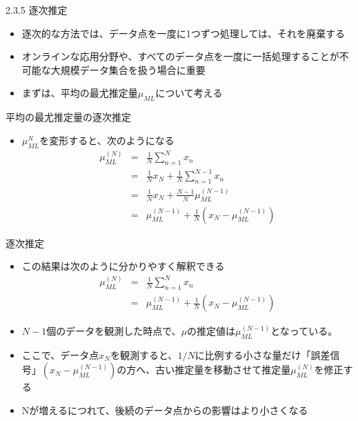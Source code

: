 \begin{frame}{2.3.5 逐次推定}
 \begin{itemize}
  \item 逐次的な方法では、データ点を一度に1つずつ処理しては、それを廃棄する
  \item オンラインな応用分野や、すべてのデータ点を一度に一括処理することが不可能な大規模データ集合を扱う場合に重要
  \item まずは、平均の最尤推定量$\mu_{ML}$について考える
 \end{itemize}
\end{frame}

\begin{frame}{平均の最尤推定量の逐次推定}
 \begin{itemize}
  \item $\mu_{ML}^{N}$を変形すると、次のようになる
        \begin{eqnarray}
         \mu_{ML}^{(N)} &= &\frac{1}{N}\sum_{n=1}^{N}x_n \nonumber \\
         & =& \frac{1}{N}x_N+\frac{1}{N}\sum_{n=1}^{N-1}x_n \nonumber \\
         & =& \frac{1}{N}x_N + \frac{N-1}{N}\mu_{ML}^{(N-1)}\nonumber \\
         & =& \mu_{ML}^{(N-1)} +\frac{1}{N} (x_N-\mu_{ML}^{(N-1)})\label{162008_21Nov14}
        \end{eqnarray}
 \end{itemize}
\end{frame}

\begin{frame}{逐次推定}
 \begin{itemize}
  \item この結果は次のように分かりやすく解釈できる
        \begin{eqnarray}
         \mu_{ML}^{(N)} &= &\frac{1}{N}\sum_{n=1}^{N}x_n \\
         & =& \mu_{ML}^{(N-1)} +\frac{1}{N} (x_N-\mu_{ML}^{(N-1)})
        \end{eqnarray}
  \item $N-1$個のデータを観測した時点で、$\mu$の推定値は$\mu_{ML}^{(N-1)}$となっている。
  \item ここで、データ点$x_N$を観測すると、$1/N$に比例する小さな量だけ「誤差信号」$(x_N-\mu_{ML}^{(N-1)})$の方へ、古い推定量を移動させて推定量$\mu_{ML}^{(N)}$を修正する
  \item Nが増えるにつれて、後続のデータ点からの影響はより小さくなる
 \end{itemize}
\end{frame}

